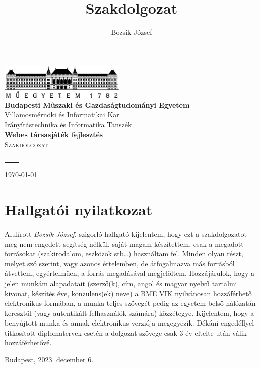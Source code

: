 \documentclass[a4paper,twoside]{article}
\title{Szakdolgozat}
\author{Bozsik József}
\newcommand{\vikszerzo}{Bozsik József}
\newcommand{\vikkonzulens}{Dr. Somogyi Péter, Aranyi Róbert}
\newcommand{\vikcim}{Webes társasjáték fejlesztés}
\newcommand{\viktanszek}{Irányítástechnika és Informatika Tanszék}
\newcommand{\vikdoktipus}{Szakdolgozat}
\begin{document}
\begin{titlepage}
	\begin{center}
		\includegraphics[width=60mm,keepaspectratio]{BMElogo.png}\\
		\vspace{0.3cm}
		\textbf{Budapesti Mûszaki és Gazdaságtudományi Egyetem}\\
		\textmd{Villamosmérnöki és Informatikai Kar}\\
		\textmd{\viktanszek}\\[5cm]
		
		\vspace{0.4cm}
		{\huge \bfseries \vikcim}\\[0.8cm]
		\vspace{0.5cm}
		\textsc{\Large \vikdoktipus}\\[4cm]
		
		\begin{tabular}{cc}
			\makebox[7cm]{\emph{Készítette}} & \makebox[7cm]{\emph{Konzulens}} \\
			\makebox[7cm]{\vikszerzo} & \makebox[7cm]{\vikkonzulens}
		\end{tabular}
		
		\vfill
		{\large \today}
	\end{center}
\end{titlepage}
\newpage
\tableofcontents
\newpage
{
\section*{Hallgatói nyilatkozat}}
Alulírott \textit{Bozsik József}, szigorló hallgató kijelentem, hogy ezt a szakdolgozatot meg
nem engedett segítség nélkül, saját magam készítettem, csak a megadott forrásokat (szakirodalom, eszközök stb\ldots) használtam fel. Minden olyan részt, melyet szó szerint, vagy
azonos értelemben, de átfogalmazva más forrásból átvettem, egyértelműen, a forrás megadásával megjelöltem.
Hozzájárulok, hogy a jelen munkám alapadatait (szerző(k), cím, angol és magyar
nyelvű tartalmi kivonat, készítés éve, konzulens(ek) neve) a BME VIK nyilvánosan hozzáférhető elektronikus formában, a munka teljes szövegét pedig az egyetem belső hálózatán
keresztül (vagy autentikált felhasználók számára) közzétegye. Kijelentem, hogy a benyújtott munka és annak elektronikus verziója megegyezik. Dékáni engedéllyel titkosított diplomatervek esetén a dolgozat szövege csak 3 év eltelte után válik hozzáférhetővé.
\begin{flushleft}
	Budapest, 2023. december 6.
\end{flushleft}
\end{document}
